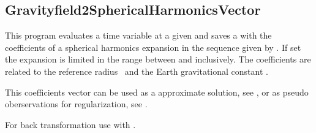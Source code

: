 \clearpage
\subsection{Gravityfield2SphericalHarmonicsVector}\label{Gravityfield2SphericalHarmonicsVector}
This program evaluates a time variable  at a given 
and saves a  with the coefficients of a spherical harmonics expansion in the sequence given by
.
If set the expansion is limited in the range between  and  inclusively.
The coefficients are related to the reference radius~ and the Earth gravitational constant .

This coefficients vector can be used as a approximate solution, see ,
or as pseudo oberservations for regularization,
see .

For back transformation use 
with .


